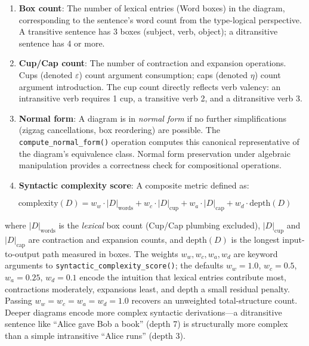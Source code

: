 \documentclass[
]{article}
\begin{document}
\begin{enumerate}
\def\labelenumi{\arabic{enumi}.}
\item
  \textbf{Box count}: The number of lexical entries (Word boxes) in the
  diagram, corresponding to the sentence's word count from the
  type-logical perspective. A transitive sentence has 3 boxes (subject,
  verb, object); a ditransitive sentence has 4 or more.
\item
  \textbf{Cup/Cap count}: The number of contraction and expansion
  operations. Cups (denoted \(\varepsilon{}\)) count argument
  consumption; caps (denoted \(\eta{}\)) count argument introduction.
  The cup count directly reflects verb valency: an intransitive verb
  requires 1 cup, a transitive verb 2, and a ditransitive verb 3.
\item
  \textbf{Normal form}: A diagram is in \emph{normal form} if no further
  simplifications (zigzag cancellations, box reordering) are possible.
  The \texttt{compute\_normal\_form()} operation computes this canonical
  representative of the diagram's equivalence class. Normal form
  preservation under algebraic manipulation provides a correctness check
  for compositional operations.
\item
  \textbf{Syntactic complexity score}: A composite metric defined as:
\end{enumerate}

\begin{equation}
\text{complexity}(D) = w_w \cdot |D|_{\text{words}} + w_c \cdot |D|_{\text{cup}} + w_a \cdot |D|_{\text{cap}} + w_d \cdot \text{depth}(D)
\label{eq:eq-4-4}
\end{equation}

where \(|D|_{\text{words}}\) is the \emph{lexical} box count (Cup/Cap
plumbing excluded), \(|D|_{\text{cup}}\) and \(|D|_{\text{cap}}\) are
contraction and expansion counts, and \(\text{depth}(D)\) is the longest
input-to-output path measured in boxes. The weights
\(w_w, w_c, w_a, w_d\) are keyword arguments to
\texttt{syntactic\_complexity\_score()}; the defaults \(w_w{=}1.0\),
\(w_c{=}0.5\), \(w_a{=}0.25\), \(w_d{=}0.1\) encode the intuition that
lexical entries contribute most, contractions moderately, expansions
least, and depth a small residual penalty. Passing
\(w_w{=}w_c{=}w_a{=}w_d{=}1.0\) recovers an unweighted total-structure
count. Deeper diagrams encode more complex syntactic derivations---a
ditransitive sentence like ``Alice gave Bob a book'' (depth 7) is
structurally more complex than a simple intransitive ``Alice runs''
(depth 3).
\end{document}
